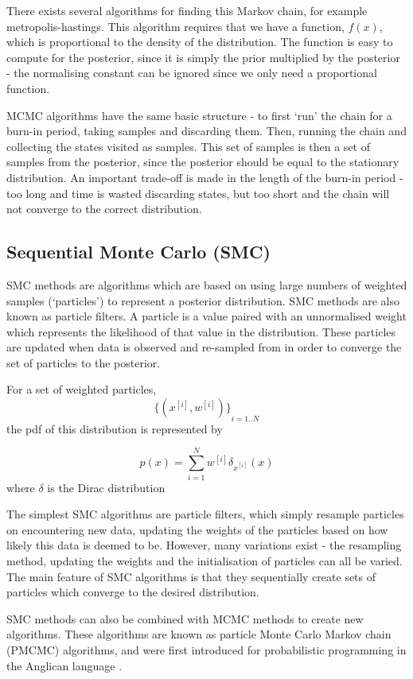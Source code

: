 There exists several algorithms for finding this Markov chain, for example metropolis-hastings. This algorithm requires that we have a function, $f(x)$, which is proportional to the density of the distribution. The function is easy to compute for the posterior, since it is simply the prior multiplied by the posterior - the normalising constant can be ignored since we only need a proportional function.
	
MCMC algorithms have the same basic structure - to first `run' the chain for a burn-in period, taking samples and discarding them. Then, running the chain and collecting the states visited as samples. This set of samples is then a set of samples from the posterior, since the posterior should be equal to the stationary distribution. An important trade-off is made in the length of the burn-in period - too long and time is wasted discarding states, but too short and the chain will not converge to the correct distribution.
	
\subsection{Sequential Monte Carlo (SMC)}
	
SMC methods are algorithms which are based on using large numbers of weighted samples (`particles') to represent a posterior distribution. SMC methods are also known as particle filters. A particle is a value paired with an unnormalised weight which represents the likelihood of that value in the distribution. These particles are updated when data is observed and re-sampled from in order to converge the set of particles to the posterior.
	
For a set of weighted particles, 
\[{\{(x^{[i]}, w^{[i]})\}}_{i=1..N}\]
the pdf of this distribution is represented by

\[
	p(x) = \sum_{i=1}^{N}w^{[i]}\delta_{x^{[i]}}(x)
\]
where $\delta$ is the Dirac distribution
	
The simplest SMC algorithms are particle filters\cite{particlefilter}, which simply resample particles on encountering new data, updating the weights of the particles based on how likely this data is deemed to be. However, many variations exist - the resampling method, updating the weights and the initialisation of particles can all be varied. The main feature of SMC algorithms is that they sequentially create sets of particles which converge to the desired distribution.

SMC methods can also be combined with MCMC methods to create new algorithms. These algorithms are known as particle Monte Carlo Markov chain (PMCMC) algorithms, and were first introduced for probabilistic programming in the Anglican language \cite{anglican-smc}.